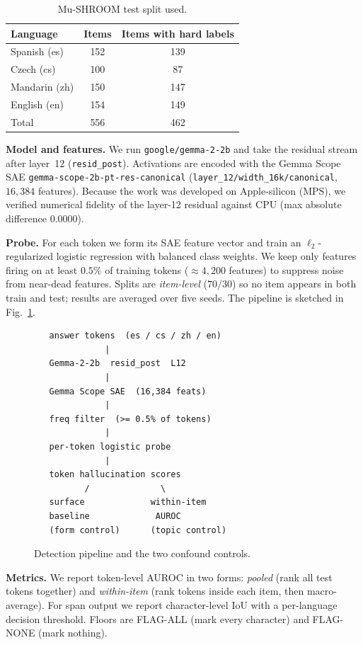 \documentclass[conference]{IEEEtran}
\begin{document}
\begin{table}[t]
\caption{Mu-SHROOM test split used.}
\label{tab:data}
\centering
\begin{tabular}{lcc}
\toprule
Language & Items & Items with hard labels \\
\midrule
Spanish (es) & 152 & 139 \\
Czech (cs)   & 100 & 87 \\
Mandarin (zh)& 150 & 147 \\
English (en) & 154 & 149 \\
\midrule
Total        & 556 & 462 \\
\bottomrule
\end{tabular}
\end{table}

\textbf{Model and features.} We run \texttt{google/gemma-2-2b} and take the
residual stream after layer~12 (\texttt{resid\_post}). Activations are encoded
with the Gemma Scope SAE \texttt{gemma-scope-2b-pt-res-canonical}
(\texttt{layer\_12/width\_16k/canonical}, $16{,}384$ features). Because the
work was developed on Apple-silicon (MPS), we verified numerical fidelity of
the layer-12 residual against CPU (max absolute difference $0.0000$).

\textbf{Probe.} For each token we form its SAE feature vector and train an
$\ell_2$-regularized logistic regression with balanced class weights. We keep
only features firing on at least $0.5\%$ of training tokens
($\approx 4{,}200$ features) to suppress noise from near-dead features. Splits
are \emph{item-level} ($70/30$) so no item appears in both train and test;
results are averaged over five seeds. The pipeline is sketched in
Fig.~\ref{fig:pipe}.

\begin{figure}[t]
\footnotesize
\begin{verbatim}
   answer tokens  (es / cs / zh / en)
              |
   Gemma-2-2b  resid_post  L12
              |
   Gemma Scope SAE  (16,384 feats)
              |
   freq filter  (>= 0.5% of tokens)
              |
   per-token logistic probe
              |
   token hallucination scores
          /              \
   surface             within-item
   baseline             AUROC
   (form control)      (topic control)
\end{verbatim}
\caption{Detection pipeline and the two confound controls.}
\label{fig:pipe}
\end{figure}

\textbf{Metrics.} We report token-level AUROC in two forms: \emph{pooled}
(rank all test tokens together) and \emph{within-item} (rank tokens inside each
item, then macro-average). For span output we report character-level IoU with a
per-language decision threshold. Floors are FLAG-ALL (mark every character) and
FLAG-NONE (mark nothing).
\end{document}
